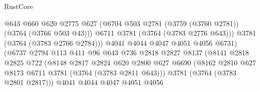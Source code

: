 \begin{lexlean}{RustCore}
\begin{coremodule}
                                        @643
                                        @660
                                        @620
                                        @2775
                                        @627
                                        (@6704
                                          @503
                                          @2781
                                          (@3759 (@3760 @2781))
                                          (@3764 (@3766 @503 @43)))
                                        @6711
                                        @3781
                                        (@3764 (@3783 @2776 @643)))
                                      @3781
                                      (@3764 (@3783 @2766 @2784)))
                                    @4041
                                    @4044
                                    @4047
                                    @4051
                                    @4056
                                    @6731)
                                  (@6737
                                    @2794
                                    @113
                                    @411
                                    @96
                                    @643
                                    @736
                                    @2818
                                    @2827
                                    @8137
                                    (@8141
                                      @2818
                                      @2825
                                      @722
                                      (@8148
                                        @2817
                                        @2824
                                        @620
                                        @2800
                                        @627
                                        @6690
                                        (@8162
                                          @2810
                                          @627
                                          @8173
                                          @6711
                                          @3781
                                          (@3764 (@3783 @2811 @643)))
                                        @3781
                                        (@3764 (@3783 @2801 @2817)))
                                      @4041
                                      @4044
                                      @4047
                                      @4051
                                      @4056

\end{coremodule}
\end{lexlean}
